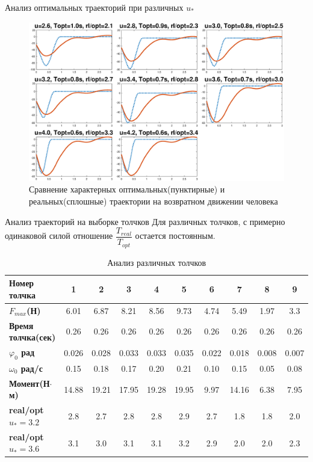 \documentclass[10pt]{beamer}
\begin{document}
\begin{frame}{Анализ оптимальных траекторий при различных $u_\ast$}
	\begin{figure}[h!]
		\centering
		\includegraphics[width=0.9\linewidth]{final_graphs_1.eps}
		\caption{Сравнение характерных оптимальных(пунктирные) и реальных(сплошные) траектории на возвратном движении человека}
		\label{final_graphs_1}
	\end{figure}
\end{frame}
\begin{frame}[shrink=21]{Анализ траекторий на выборке толчков}
	Для различных толчков, с примерно одинаковой силой отношение $\dfrac{T_{real}}{T_{opt}}$ остается постоянным.
	\begin{table}[h!]
		\centering
		\begin{tabular}{|l|c|c|c|c|c|c|c|c|c|}
			\hline
			\textbf{Номер толчка}       & \textbf{1} & \textbf{2} & \textbf{3} & \textbf{4} & \textbf{5} & \textbf{6} & \textbf{7} & \textbf{8} & \textbf{9} \\ \hline
			\textbf{$F_{max}$(Н)}       & 6.01       & 6.87       & 8.21       & 8.56       & 9.73       & 4.74       & 5.49       & 1.97       & 3.3        \\ \hline
			\textbf{Время толчка(сек)}  & 0.26       & 0.26       & 0.26       & 0.26       & 0.26       & 0.26       & 0.26       & 0.26       & 0.26       \\ \hline
			\textbf{$\varphi_0$ рад}    & 0.026      & 0.028      & 0.033      & 0.033      & 0.035      & 0.022      & 0.018      & 0.008      & 0.007      \\ \hline
			\textbf{$\omega_0$ рад/с}   & 0.15       & 0.18       & 0.17       & 0.20       & 0.21       & 0.10       & 0.15       & 0.05       & 0.08       \\ \hline
			\textbf{Момент(Н$\cdot$м)}  & 14.88      & 19.21      & 17.95      & 19.28      & 19.95      & 9.97       & 14.16      & 6.38       & 7.95       \\ \hline
			\textbf{real/opt $u_*=3.2$} & 2.8        & 2.7        & 2.8        & 2.8        & 2.9        & 2.7        & 1.8        & 1.8        & 2.0        \\ \hline
			\textbf{real/opt $u_*=3.6$} & 3.1        & 3.0        & 3.1        & 3.1        & 3.2        & 2.9        & 2.0        & 2.0        & 2.3        \\ \hline
		\end{tabular}
		\caption{Анализ различных толчков}
		\label{final_table}
	\end{table}
\end{frame}
\end{document}
